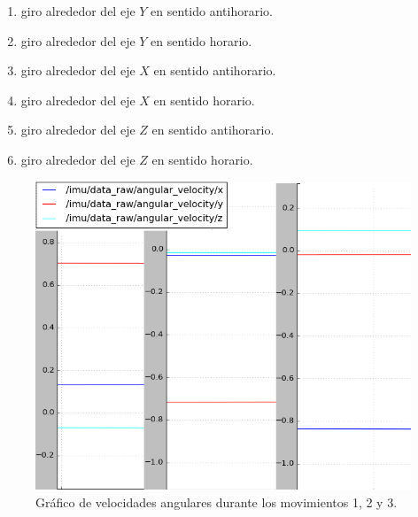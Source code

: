 \begin{enumerate}
    \item giro alrededor del eje $Y$ en sentido antihorario.
    \item giro alrededor del eje $Y$ en sentido horario.
    \item giro alrededor del eje $X$ en sentido antihorario.
    \item giro alrededor del eje $X$ en sentido horario.
    \item giro alrededor del eje $Z$ en sentido antihorario.
    \item giro alrededor del eje $Z$ en sentido horario.
\end{enumerate}

\begin{figure}[ht]
    \centering
    \includegraphics[scale=0.42]{./Figures/angular_velocity_1.png}
    \caption{Gráfico de velocidades angulares durante los movimientos 1, 2 y 3.}
    \label{fig:velocidadAngular1}
\end{figure}

